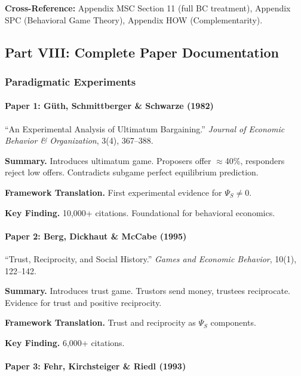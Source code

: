 \textbf{Cross-Reference:} Appendix MSC Section 11 (full BC treatment),
Appendix SPC (Behavioral Game Theory), Appendix HOW (Complementarity).

\subsection{Part VIII: Complete Paper Documentation}

\subsubsection{Paradigmatic Experiments}

\paragraph{Paper 1: Güth, Schmittberger \& Schwarze (1982)}

``An Experimental Analysis of Ultimatum Bargaining.''
\textit{Journal of Economic Behavior \& Organization}, 3(4), 367--388.

\textbf{Summary.}
Introduces ultimatum game. Proposers offer $\approx$40\%, responders reject 
low offers. Contradicts subgame perfect equilibrium prediction.

\textbf{Framework Translation.}
First experimental evidence for $\Psi_S \neq 0$.

\textbf{Key Finding.}
10,000+ citations. Foundational for behavioral economics.

\paragraph{Paper 2: Berg, Dickhaut \& McCabe (1995)}

``Trust, Reciprocity, and Social History.''
\textit{Games and Economic Behavior}, 10(1), 122--142.

\textbf{Summary.}
Introduces trust game. Trustors send money, trustees reciprocate.
Evidence for trust and positive reciprocity.

\textbf{Framework Translation.}
Trust and reciprocity as $\Psi_S$ components.

\textbf{Key Finding.}
6,000+ citations.

\paragraph{Paper 3: Fehr, Kirchsteiger \& Riedl (1993)}


